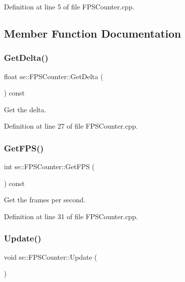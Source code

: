 Definition at line 5 of file F\+P\+S\+Counter.\+cpp.



\subsection{Member Function Documentation}
\mbox{\label{classse_1_1_f_p_s_counter_ac39be1bd1ff3954813d6d5733825abb1}} 
\subsubsection{\texorpdfstring{Get\+Delta()}{GetDelta()}}
{\footnotesize\ttfamily float se\+::\+F\+P\+S\+Counter\+::\+Get\+Delta (\begin{DoxyParamCaption}{ }\end{DoxyParamCaption}) const}

Get the delta. 

Definition at line 27 of file F\+P\+S\+Counter.\+cpp.

\mbox{\label{classse_1_1_f_p_s_counter_a6e3fc56e01f9696ce549264f6246fa01}} 
\subsubsection{\texorpdfstring{Get\+F\+P\+S()}{GetFPS()}}
{\footnotesize\ttfamily int se\+::\+F\+P\+S\+Counter\+::\+Get\+F\+PS (\begin{DoxyParamCaption}{ }\end{DoxyParamCaption}) const}

Get the frames per second. 

Definition at line 31 of file F\+P\+S\+Counter.\+cpp.

\mbox{\label{classse_1_1_f_p_s_counter_a863da58355d25fcf9f76b9cc697101e4}} 
\subsubsection{\texorpdfstring{Update()}{Update()}}
{\footnotesize\ttfamily void se\+::\+F\+P\+S\+Counter\+::\+Update (\begin{DoxyParamCaption}{ }\end{DoxyParamCaption})}

